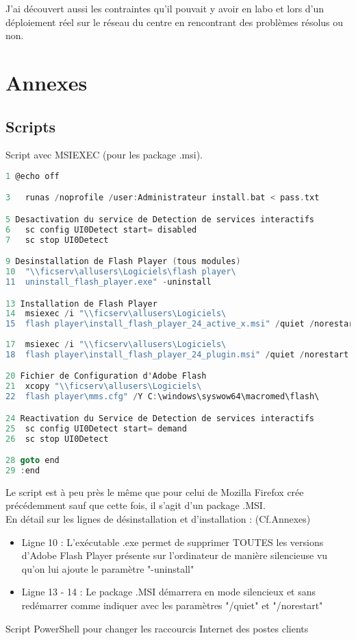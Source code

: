 \documentclass[11pt,a4paper,oneside]{article}
\begin{document}
J'ai découvert aussi les contraintes qu'il pouvait y avoir en labo et lors d'un déploiement réel sur le réseau du centre en rencontrant des problèmes résolus ou non.
\newpage
\section{Annexes}
\subsection{Scripts}
Script avec MSIEXEC (pour les package .msi).
\begin{lstlisting}[language=C]
1 @echo off

3	runas /noprofile /user:Administrateur install.bat < pass.txt

5 Desactivation du service de Detection de services interactifs
6	sc config UI0Detect start= disabled
7	sc stop UI0Detect

9 Desinstallation de Flash Player (tous modules)
10	"\\ficserv\allusers\Logiciels\flash player\
11	uninstall_flash_player.exe" -uninstall

13 Installation de Flash Player
14	msiexec /i "\\ficserv\allusers\Logiciels\
15	flash player\install_flash_player_24_active_x.msi" /quiet /norestart
	
17	msiexec /i "\\ficserv\allusers\Logiciels\
18	flash player\install_flash_player_24_plugin.msi" /quiet /norestart

20 Fichier de Configuration d'Adobe Flash 
21	xcopy "\\ficserv\allusers\Logiciels\
22	flash player\mms.cfg" /Y C:\windows\syswow64\macromed\flash\ 

24 Reactivation du Service de Detection de services interactifs
25	sc config UI0Detect start= demand
26	sc stop UI0Detect

28 goto end
29 :end
\end{lstlisting}

Le script est à peu près le même que pour celui de Mozilla Firefox crée précédemment sauf que cette fois, il s'agit d'un package .MSI.\\
En détail sur les lignes de désinstallation et d'installation : (Cf.Annexes) \\
\begin{itemize}
\item Ligne 10 : L'exécutable .exe permet de supprimer TOUTES les versions d'Adobe Flash Player présente sur 			l'ordinateur de manière silencieuse vu qu'on lui ajoute le paramètre "-uninstall" \\

\item Ligne 13 - 14 : Le package .MSI démarrera en mode silencieux et sans redémarrer comme indiquer avec les paramètres "/quiet" et "/norestart"
\end{itemize}
\newpage
Script PowerShell pour changer les raccourcis Internet des postes clients
\end{document}
